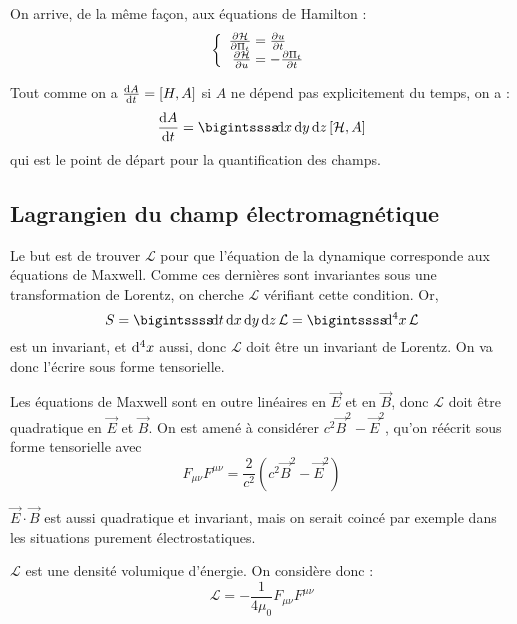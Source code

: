 On arrive, de la même façon, aux équations de Hamilton :
$$
	\left\{\begin{array}{r@{\;}l}
		\frac{\partial \mathcal{H}}{\partial\Pi_t}&=\frac{\partial u}{\partial t}\\
		\frac{\partial \mathcal{H}}{\partial u}&=-\frac{\partial \Pi_t}{\partial t}
	\end{array}\right.
$$

\begin{remark}
	Tout comme on a $\frac{\mathrm{d} A}{\mathrm{d} t}=[H,A]$ si $A$ ne dépend pas explicitement du temps, on a :
	$$
		\frac{\dif A}{\dif t}=\bigintssss\!\dif x\,\dif y\,\dif z\,[\mathcal{H},A]
	$$
	qui est le point de départ pour la quantification des champs.
\end{remark}

\subsection{Lagrangien du champ électromagnétique}
Le but est de trouver $\mathcal{L}$ pour que l'équation de la dynamique corresponde aux équations de Maxwell. Comme ces dernières sont invariantes sous une transformation de Lorentz, on cherche $\mathcal{L}$ vérifiant cette condition. Or, 
$$
	S=\bigintssss\!\dif t\,\dif x\,\dif y\,\dif z\,\mathcal{L}=\bigintssss\!\dif^4x\,\mathcal{L}
$$
est un invariant, et $\mathrm{d}^4x$ aussi, donc $\mathcal{L}$ doit être un invariant de Lorentz. On va donc l'écrire sous forme tensorielle.

Les équations de Maxwell sont en outre linéaires en $\vec{E}$ et en $\vec{B}$, donc $\mathcal{L}$ doit être quadratique en $\vec{E}$ et $\vec{B}$. On est amené à considérer $c^2\vec{B}^2-\vec{E}^2$, qu'on réécrit sous forme tensorielle avec
$$
	F_{\mu\nu}F^{\mu\nu}=\frac{2}{c^2}(c^2\vec{B}^2-\vec{E}^2)
$$

\begin{remark}
	$\vec{E}\cdot\vec{B}$ est aussi quadratique et invariant, mais on serait coincé par exemple dans les situations purement électrostatiques.
\end{remark}

$\mathcal{L}$ est une densité volumique d'énergie. On considère donc :
$$
	\mathcal{L}=-\frac{1}{4\mu_0}F_{\mu\nu}F^{\mu\nu}
$$

